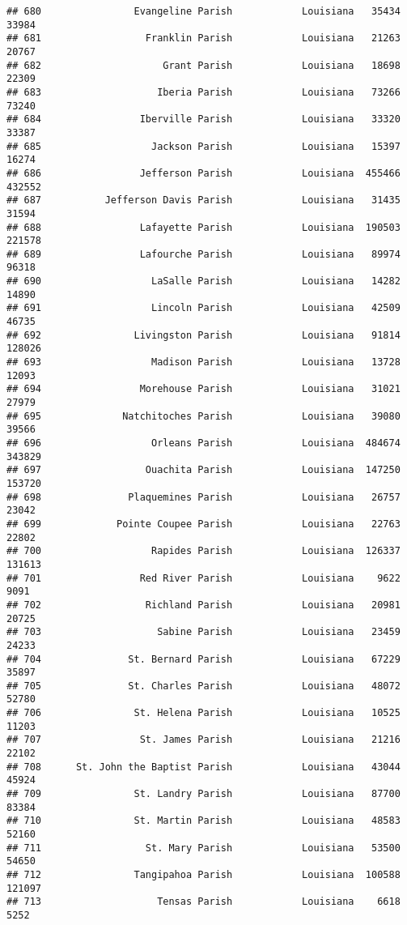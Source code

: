 \documentclass[
]{article}
\begin{document}
\begin{verbatim}
## 680                Evangeline Parish            Louisiana   35434   33984
## 681                  Franklin Parish            Louisiana   21263   20767
## 682                     Grant Parish            Louisiana   18698   22309
## 683                    Iberia Parish            Louisiana   73266   73240
## 684                 Iberville Parish            Louisiana   33320   33387
## 685                   Jackson Parish            Louisiana   15397   16274
## 686                 Jefferson Parish            Louisiana  455466  432552
## 687           Jefferson Davis Parish            Louisiana   31435   31594
## 688                 Lafayette Parish            Louisiana  190503  221578
## 689                 Lafourche Parish            Louisiana   89974   96318
## 690                   LaSalle Parish            Louisiana   14282   14890
## 691                   Lincoln Parish            Louisiana   42509   46735
## 692                Livingston Parish            Louisiana   91814  128026
## 693                   Madison Parish            Louisiana   13728   12093
## 694                 Morehouse Parish            Louisiana   31021   27979
## 695              Natchitoches Parish            Louisiana   39080   39566
## 696                   Orleans Parish            Louisiana  484674  343829
## 697                  Ouachita Parish            Louisiana  147250  153720
## 698               Plaquemines Parish            Louisiana   26757   23042
## 699             Pointe Coupee Parish            Louisiana   22763   22802
## 700                   Rapides Parish            Louisiana  126337  131613
## 701                 Red River Parish            Louisiana    9622    9091
## 702                  Richland Parish            Louisiana   20981   20725
## 703                    Sabine Parish            Louisiana   23459   24233
## 704               St. Bernard Parish            Louisiana   67229   35897
## 705               St. Charles Parish            Louisiana   48072   52780
## 706                St. Helena Parish            Louisiana   10525   11203
## 707                 St. James Parish            Louisiana   21216   22102
## 708      St. John the Baptist Parish            Louisiana   43044   45924
## 709                St. Landry Parish            Louisiana   87700   83384
## 710                St. Martin Parish            Louisiana   48583   52160
## 711                  St. Mary Parish            Louisiana   53500   54650
## 712                Tangipahoa Parish            Louisiana  100588  121097
## 713                    Tensas Parish            Louisiana    6618    5252

\end{verbatim}
\end{document}
